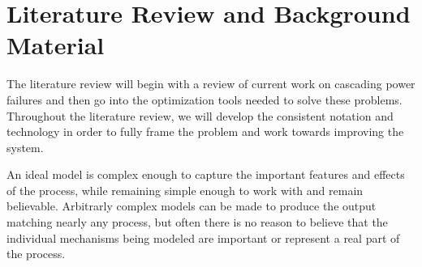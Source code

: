 \chapter{Literature Review and Background Material}

The literature review will begin with a review of current work on cascading power failures and then go into the optimization tools needed to solve these problems.  Throughout the literature review, we will develop the consistent notation and technology in order to fully frame the problem and work towards improving the system.

An ideal model is complex enough to capture the important features and effects of the process, while remaining simple enough to work with and remain believable.  Arbitrarly complex models can be made to produce the output matching nearly any process, but often there is no reason to believe that the individual mechanisms being modeled are important or represent a real part of the process.



